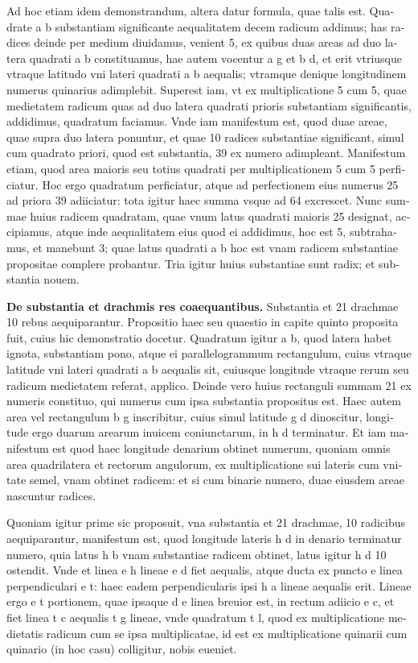 \documentclass[11pt,a4paper]{book}
\begin{document}
\textlatin{Ad hoc etiam idem demonstrandum, altera datur formula, quae talis est. Quadrate a b substantiam significante aequalitatem decem radicum addimus; has radices deinde per medium diuidamus, venient 5, ex quibus duas areas ad duo latera quadrati a b constituamus, hae autem vocentur a g et b d, et erit vtriusque vtraque latitudo vni lateri quadrati a b aequalis; vtramque denique longitudinem numerus quinarius adimplebit. Superest iam, vt ex multiplicatione 5 cum 5, quae medietatem radicum quas ad duo latera quadrati prioris substantiam significantis, addidimus, quadratum faciamus. Vnde iam manifestum est, quod duae areae, quae supra duo latera ponuntur, et quae 10 radices substantiae significant, simul cum quadrato priori, quod est substantia, 39 ex numero adimpleant. Manifestum etiam, quod area maioris seu totius quadrati per multiplicationem 5 cum 5 perficiatur. Hoc ergo quadratum perficiatur, atque ad perfectionem eius numerus 25 ad priora 39 adiiciatur: tota igitur haec summa vsque ad 64 excrescet. Nunc summae huius radicem quadratam, quae vnum latus quadrati maioris 25 designat, accipiamus, atque inde aequalitatem eius quod ei addidimus, hoc est 5, subtrahamus, et manebunt 3; quae latus quadrati a b hoc est vnam radicem substantiae propositae complere probantur. Tria igitur huius substantiae sunt radix; et substantia nouem.}

\textlatin{\textbf{De substantia et drachmis res coaequantibus.} Substantia et 21 drachmae 10 rebus aequiparantur. Propositio haec seu quaestio in capite quinto proposita fuit, cuius hic demonstratio docetur. Quadratum igitur a b, quod latera habet ignota, substantiam pono, atque ei parallelogrammum rectangulum, cuius vtraque latitude vni lateri quadrati a b aequalis sit, cuiusque longitude vtraque rerum seu radicum medietatem referat, applico. Deinde vero huius rectanguli summam 21 ex numeris constituo, qui numerus cum ipsa substantia propositus est. Haec autem area vel rectangulum b g inscribitur, cuius simul latitude g d dinoscitur, longitude ergo duarum arearum inuicem coniunctarum, in h d terminatur. Et iam manifestum est quod haec longitude denarium obtinet numerum, quoniam omnis area quadrilatera et rectorum angulorum, ex multiplicatione sui lateris cum vnitate semel, vnam obtinet radicem: et si cum binarie numero, duae eiusdem areae nascuntur radices.}

\textlatin{Quoniam igitur prime sic proposuit, vna substantia et 21 drachmae, 10 radicibus aequiparantur, manifestum est, quod longitude lateris h d in denario terminatur numero, quia latus h b vnam substantiae radicem obtinet, latus igitur h d 10 ostendit. Vnde et linea e h lineae e d fiet aequalis, atque ducta ex puncto e linea perpendiculari e t: haec eadem perpendicularis ipsi h a lineae aequalis erit. Lineae ergo e t portionem, quae ipsaque d e linea breuior est, in rectum adiicio e c, et fiet linea t c aequalis t g lineae, vnde quadratum t l, quod ex multiplicatione medietatis radicum cum se ipsa multiplicatae, id est ex multiplicatione quinarii cum quinario (in hoc casu) colligitur, nobis eueniet.}
\end{document}
